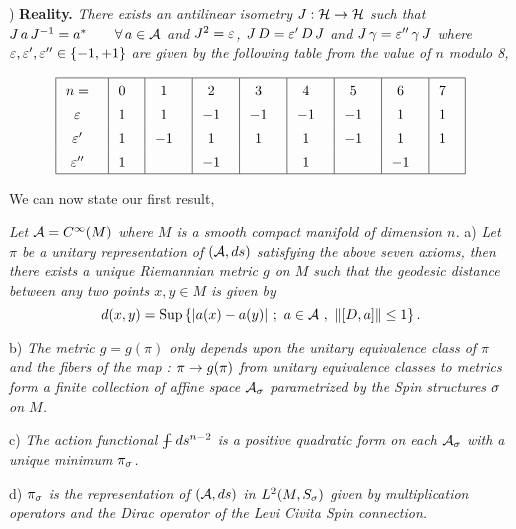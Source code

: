 \medskip

) {\bf Reality.} {\it There exists an
antilinear isometry $J: {\cal H} \rightarrow {\cal H}$ such that $J \, a \,
J^{-1} = a^* \qquad \forall \, a\in {\cal A}$ and $J^2 =\varepsilon$, $J
\, D = \varepsilon' \, D \, J$ and $J \, \gamma = \varepsilon'' \, \gamma \, J$
where $\varepsilon ,\varepsilon' ,\varepsilon'' \in \{ -1,+1\}$ are given by the
following table from the value of $n$ modulo 8,}

$$
\vbox{
\offinterlineskip
\halign{
\tv#&#   &\tv#&#  &\tv#&#  &\tv#&#  &\tv#&#  
&\tv#&#  &\tv#&#  &\tv#&# &\tv#&# &\tv#&# 
&\tv#\cr
\noalign{\hrule}
\cc{$n=$} &&\cc{$0$} &&\cc{$1$} &&\cc{$2$} &&\cc{$3$} 
&&\cc{$4$} &&\cc{$5$} &&\cc{$6$} &&\cc{$7$} &&\cr 
\cc{$\ve$} &&\cc{$1$} &&\cc{$1$} &&\cc{$-1$} 
&&\cc{$-1$} &&\cc{$-1$} &&\cc{$-1$} &&\cc{$1$} 
&&\cc{$1$} &&\cr
\cc{$\ve'$} &&\cc{$1$} &&\cc{$-1$} &&\cc{$1$} &&\cc{$1$} 
&&\cc{$1$} &&\cc{$-1$} &&\cc{$1$} &&\cc{$1$} &&\cr
\cc{$\ve''$} &&\cc{$1$} && &&\cc{$-1$} 
&& &&\cc{$1$} && &&\cc{$-1$} && &&\cr
\noalign{\hrule} }}
$$

\medskip

\noindent We can now state our first result,

\medskip

 {\it Let ${\cal A} = C^{\infty} (M)$
where $M$ is a smooth compact manifold of dimension $n$.}
a) {\it Let $\pi$ be a unitary representation of $({\cal A}
,ds)$ satisfying the above seven axioms, then there exists
a unique Riemannian metric $g$ on $M$ such that the
geodesic distance between any two points $x,y \in M$ is
given by} 
$$
d(x,y) = \mathop{\rm Sup}\nolimits \, \{ \vert a(x) - a(y)\vert \ ; \ a\in {\cal A} \
, \ \Vert [D,a]\Vert \leq 1 \} \, .
$$

\noindent b) {\it The metric $g=g(\pi)$ only depends upon
the unitary equivalence class of $\pi$ and the fibers of
the map : $\pi \rightarrow g(\pi)$ from unitary equivalence classes
to metrics form a finite collection of affine space
${\cal A}_{\sigma}$ parametrized by the Spin structures $\sigma$ on
$M$.}

\smallskip

\noindent c) {\it The action functional $\int \!\!\!\!\! - \, ds^{n-2}$
is a positive quadratic form on each ${\cal A}_{\sigma}$ with a
unique minimum $\pi_{\sigma}$.}

\smallskip

\noindent d) {\it $\pi_{\sigma}$ is the representation of
$({\cal A} ,ds)$ in $L^2 (M,S_{\sigma})$ given by multiplication
operators and the Dirac operator of the Levi Civita Spin
connection.}

\smallskip

